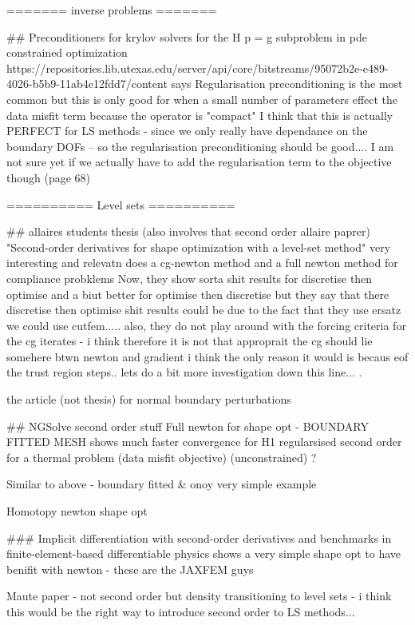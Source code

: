 =======
inverse problems
=======

## Preconditioners for krylov solvers for the H p = g subproblem in pde constrained optimization 
https://repositories.lib.utexas.edu/server/api/core/bitstreams/95072b2e-e489-4026-b5b9-11ab4e12fdd7/content
says Regularisation preconditioning is the most common
but this is only good for when a small number of parameters effect the data misfit term because the operator is "compact" 
I think that this is actually PERFECT for LS methods - since we only really have dependance on the boundary DOFs -- so the regularisation preconditioning should be good....
I am not sure yet if we actually have to add the regularisation term to the objective though
(page 68)

==========
Level sets
==========

## allaires students thesis (also involves that second order allaire paprer)
"Second-order derivatives for shape optimization with a level-set method"
\cite{vie2016second}
very interesting and relevatn
does a cg-newton method and a full newton method for compliance probklems 
Now, they show sorta shit results for discretise then optimise and a biut better for optimise then discretise 
but they say that there discretise then optimise shit results could be due to the fact that they use ersatz 
we could use cutfem..... 
also, they do not play around with the forcing criteria for the cg iterates - i think therefore it is not that approprait
the cg should lie somehere btwn newton and gradient
i think the only reason it would is becaus eof the trust region steps.. 
lets do a bit more investigation down this line... .

\cite{Allaire2016}
the article (not thesis) for normal boundary perturbations

## NGSolve second order stuff 
Full newton for shape opt - BOUNDARY FITTED MESH
\cite{Gangl2020}
shows much faster convergence for H1 regularsised second order for a thermal problem (data misfit objective)
(unconstrained) ? 

\cite{Etling2018}
Similar to above - boundary fitted & onoy very simple example

Homotopy newton shape opt
\cite{Gangl2024}

### Implicit differentiation with second-order derivatives and benchmarks in finite-element-based differentiable physics
shows a very simple shape opt to have benifit with newton - these are the JAXFEM guys

\cite{Hghj2025}
Maute paper - not second order but density transitioning to level sets - i think this would be the right way to introduce second order to LS methods... 



